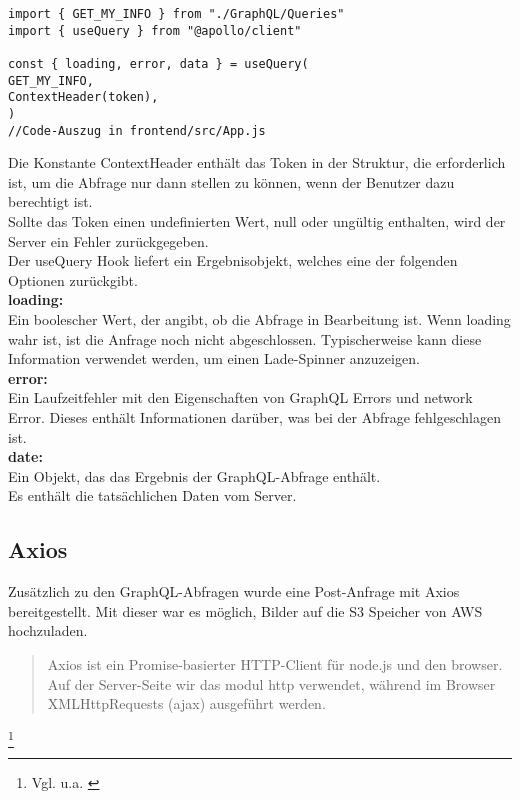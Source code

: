 \begin{lstlisting}
import { GET_MY_INFO } from "./GraphQL/Queries"
import { useQuery } from "@apollo/client"

const { loading, error, data } = useQuery(
GET_MY_INFO,
ContextHeader(token),
)
//Code-Auszug in frontend/src/App.js

\end{lstlisting}
Die Konstante ContextHeader enthält das Token in der Struktur, die erforderlich ist, um die Abfrage nur dann stellen zu können, wenn der Benutzer dazu berechtigt ist.
\\
Sollte das Token einen undefinierten Wert, null oder ungültig enthalten, wird der Server ein Fehler zurückgegeben.
\\
Der useQuery Hook liefert ein Ergebnisobjekt, welches eine der folgenden Optionen zurückgibt.
\\
\textbf{loading:}\\
Ein boolescher Wert, der angibt, ob die Abfrage in Bearbeitung ist.
Wenn loading wahr ist, ist die Anfrage noch nicht abgeschlossen. Typischerweise kann diese Information verwendet werden, um einen Lade-Spinner anzuzeigen.
\\
\textbf{error:}\\
Ein Laufzeitfehler mit den Eigenschaften von GraphQL Errors und network Error.
Dieses enthält Informationen darüber, was bei der Abfrage fehlgeschlagen  ist.
\\
\textbf{date:}\\
Ein Objekt, das das Ergebnis der GraphQL-Abfrage enthält.
\\Es enthält die tatsächlichen Daten vom Server.
\\

\newpage
\subsection{Axios}
Zusätzlich zu den GraphQL-Abfragen wurde eine Post-Anfrage mit Axios bereitgestellt.
Mit dieser war es möglich, Bilder auf die S3 Speicher von AWS hochzuladen.

\begin{quote}
  Axios ist ein Promise-basierter HTTP-Client für node.js und den browser. Auf der Server-Seite wir das modul http verwendet, während im Browser XMLHttpRequests (ajax) ausgeführt werden.
\end{quote}\footnote{Vgl. u.a. \cite{AX1}}

